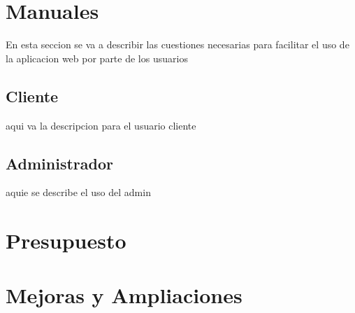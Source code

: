 \documentclass[a4paper]{article}
\begin{document}
	
    \section{Manuales}
    En esta seccion se va a describir las cuestiones necesarias para facilitar el uso de la aplicacion web por parte de los usuarios
        \subsection{Cliente}
    aqui va la descripcion para el usuario cliente
        \subsection{Administrador}
    aquie se describe el uso del admin

	\section{Presupuesto}

    \section{Mejoras y Ampliaciones}
    
    
    
    
\end{document}
